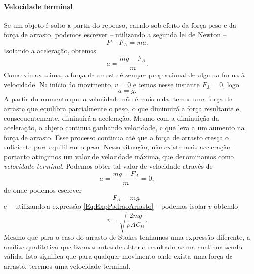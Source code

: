 \paragraph{Velocidade terminal}
Se um objeto é solto a partir do repouso, caindo sob efeito da força peso e da força de arrasto, podemos escrever -- utilizando a segunda lei de Newton --
\begin{equation}
  P - F_A = ma.
\end{equation}
%
Isolando a aceleração, obtemos
\begin{equation}
  a = \frac{mg - F_A}{m}.
\end{equation}
%
Como vimos acima, a força de arrasto é sempre proporcional de alguma forma à velocidade. No início do movimento, $v = 0$ e temos nesse instante $F_A = 0$, logo
\begin{equation}
  a = g.
\end{equation}
%
A partir do momento que a velocidade não é mais nula, temos uma força de arrasto que equilibra parcialmente o peso, o que diminuirá a força resultante e, consequentemente, diminuirá a aceleração. Mesmo com a diminuição da aceleração, o objeto continua ganhando velocidade, o que leva a um aumento na força de arrasto. Esse processo continua até que a força de arrasto cresça o suficiente para equilibrar o peso. Nessa situação, não existe mais aceleração, portanto atingimos um valor de velocidade máxima, que denominamos como \emph{velocidade terminal}. Podemos obter tal valor de velocidade através de
\begin{equation}
  a = \frac{mg - F_A}{m} = 0,
\end{equation}
%
de onde podemos escrever
\begin{equation}
  F_A = mg,
\end{equation}
%
e -- utilizando a expressão \eqref{Eq:ExpPadraoArrasto} -- podemos isolar $v$ obtendo
\begin{equation}
  v = \sqrt{\frac{2mg}{\rho A C_D}}.
\end{equation}
%
Mesmo que para o caso do arrasto de Stokes tenhamos uma expressão diferente, a análise qualitativa que fizemos antes de obter o resultado acima continua sendo válida. Isto significa que para qualquer movimento onde exista uma força de arrasto, teremos uma velocidade terminal.

